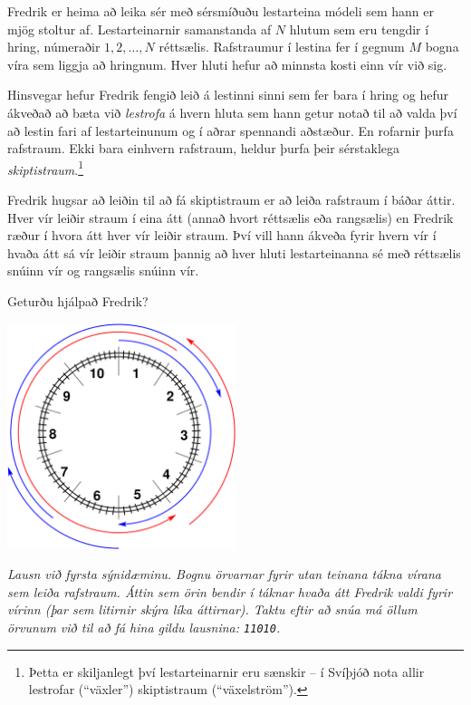 \ifx\boi\undefined\fi
\def\version{jury-1}
Fredrik er heima að leika sér með sérsmíðuðu lestarteina módeli sem hann er mjög stoltur af.
Lestarteinarnir samanstanda af $N$ hlutum sem eru tengdir í hring, númeraðir $1, 2, \dots, N$ réttsælis.
Rafstraumur í lestina fer í gegnum $M$ bogna víra sem liggja að hringnum. Hver hluti hefur að minnsta kosti einn vír við sig.

Hinsvegar hefur Fredrik fengið leið á lestinni sinni sem fer bara í hring og hefur ákveðað að bæta við 
\emph{lestrofa} á hvern hluta sem hann getur notað til að valda því að lestin fari af lestarteinunum og
í aðrar spennandi aðstæður. En rofarnir þurfa rafstraum. Ekki bara einhvern rafstraum, heldur þurfa þeir
sérstaklega \emph{skiptistraum}.\footnote{Þetta er skiljanlegt því lestarteinarnir eru sænskir -- í Svíþjóð
nota allir lestrofar (``växler'') skiptistraum (``växelström'').}

Fredrik hugsar að leiðin til að fá skiptistraum er að leiða rafstraum í báðar áttir.
Hver vír leiðir straum í eina átt (annað hvort réttsælis eða rangsælis) en Fredrik
ræður í hvora átt hver vír leiðir straum. Því vill hann ákveða fyrir hvern vír í hvaða
átt sá vír leiðir straum þannig að hver hluti lestarteinanna sé með réttsælis snúinn vír og rangsælis snúinn vír.

Geturðu hjálpað Fredrik?

\vspace{2mm}
\begin{center}
\includegraphics[width=0.5\textwidth]{alternatingfig.pdf}
\end{center}
\vspace{1mm}
{\em Lausn við fyrsta sýnidæminu. Bognu örvarnar fyrir utan teinana tákna vírana sem leiða rafstraum. Áttin sem örin bendir í táknar hvaða átt Fredrik valdi fyrir vírinn (þar sem litirnir skýra líka áttirnar). Taktu eftir að snúa má öllum örvunum við til að fá hina gildu lausnina: \texttt{11010}.}

